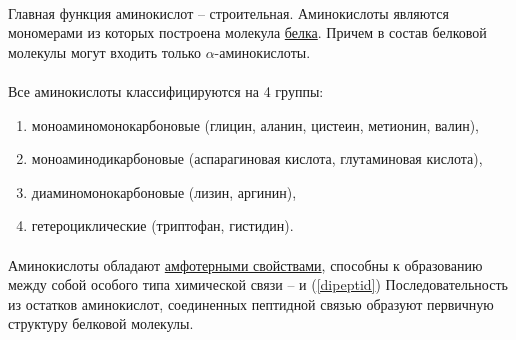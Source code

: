
\paragraph*{}Главная функция аминокислот -- строительная. Аминокислоты являются мономерами из которых построена молекула \hyperlink{proteins}{белка}. Причем в состав белковой молекулы могут входить только $\alpha$-аминокислоты.

\paragraph*{}Все аминокислоты классифицируются на 4 группы:

\begin{enumerate}

	\item моноаминомонокарбоновые (глицин, аланин, цистеин, метионин, валин),
	\item моноаминодикарбоновые (аспарагиновая кислота, глутаминовая кислота),
	\item диаминомонокарбоновые (лизин, аргинин),
	\item гетероциклические (триптофан, гистидин).

\end{enumerate}


\paragraph*{}Аминокислоты обладают \hyperlink{aminoacids}{амфотерными свойствами}, способны к образованию между собой особого типа химической связи -- \hypertarget{pept_bound}{} и  (\ris \ref{dipeptid}) Последовательность из остатков аминокислот, соединенных пептидной связью образуют первичную структуру белковой молекулы.

